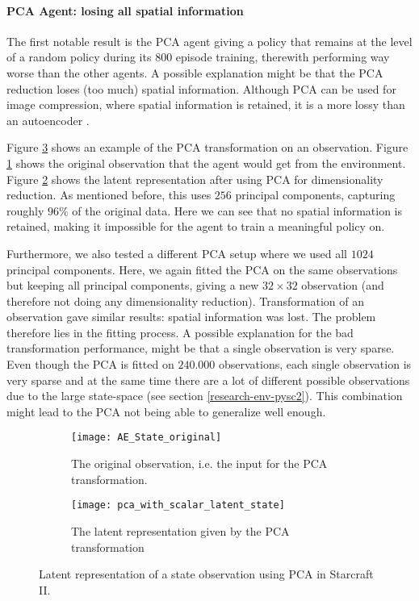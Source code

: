 \paragraph{PCA Agent: losing all spatial information}
The first notable result is the PCA agent giving a policy that remains at the level of a random policy during its $800$ episode training, therewith performing way worse than the other agents. A possible explanation might be that the PCA reduction loses (too much) spatial information. Although PCA can be used for image compression, where spatial information is retained, it is a more lossy than an autoencoder \cite{pca_ae}.

Figure \ref{fig:pca-state} shows an example of the PCA transformation on an observation. Figure \ref{fig:pca-original} shows the original observation that the agent would get from the environment. Figure \ref{fig:pca-latent} shows the latent representation after using PCA for dimensionality reduction. As mentioned before, this uses $256$ principal components, capturing roughly $96\%$ of the original data. Here we can see that no spatial information is retained, making it impossible for the agent to train a meaningful policy on. 

Furthermore, we also tested a different PCA setup where we used all $1024$ principal components. Here, we again fitted the PCA on the same observations but keeping all principal components, giving a new $32 \times 32$ observation (and therefore not doing any dimensionality reduction). Transformation of an observation gave similar results: spatial information was lost. The problem therefore lies in the fitting process. A possible explanation for the bad transformation performance, might be that a single observation is very sparse. Even though the PCA is fitted on $240.000$ observations, each single observation is very sparse and at the same time there are a lot of different possible observations due to the large state-space (see section \ref{research-env-pysc2}). This combination might lead to the PCA not being able to generalize well enough.

\begin{figure}[h!]
	\centering
	\begin{subfigure}[b]{0.3\textwidth}
		\texttt{[image: AE\_State\_original]}
		\caption{The original observation, i.e. the input for the PCA transformation.}
		\label{fig:pca-original} 
	\end{subfigure}\hfill
	\begin{subfigure}[b]{0.3\textwidth}
	\texttt{[image: pca\_with\_scalar\_latent\_state]}
		\caption{The latent representation given by the PCA transformation}
		\label{fig:pca-latent}
	\end{subfigure}
	\caption{Latent representation of a state observation using PCA in Starcraft II.}
	\label{fig:pca-state}
\end{figure}

